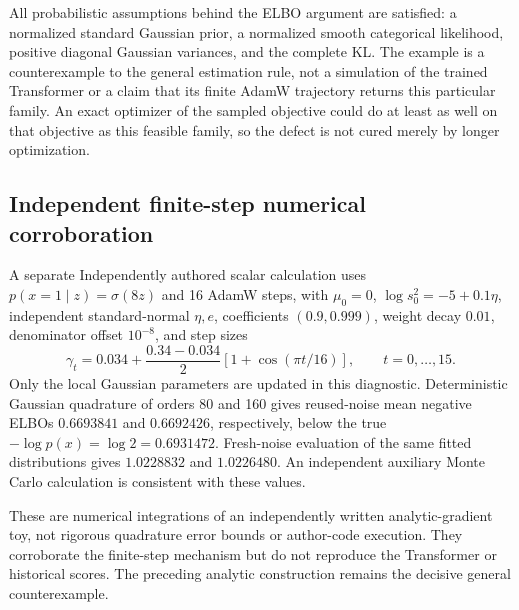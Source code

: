 \documentclass[10pt]{article}
\begin{document}
All probabilistic assumptions behind the ELBO argument are satisfied: a normalized standard Gaussian prior, a normalized smooth categorical likelihood, positive diagonal Gaussian variances, and the complete KL. The example is a counterexample to the general estimation rule, not a simulation of the trained Transformer or a claim that its finite AdamW trajectory returns this particular family. An exact optimizer of the sampled objective could do at least as well on that objective as this feasible family, so the defect is not cured merely by longer optimization.\par
\subsection*{Independent finite-step numerical corroboration}
A separate Independently authored scalar calculation uses \(p(x=1\mid z)=\sigma(8z)\) and 16 AdamW steps, with \(\mu_0=0\), \(\log s_0^2=-5+0.1\eta\), independent standard-normal \(\eta,e\), coefficients \((0.9,0.999)\), weight decay \(0.01\), denominator offset \(10^{-8}\), and step sizes \[\gamma_t=0.034+\frac{0.34-0.034}{2}
 [1+\cos(\pi t/16)],\qquad t=0,\ldots,15.\] Only the local Gaussian parameters are updated in this diagnostic. Deterministic Gaussian quadrature of orders 80 and 160 gives reused-noise mean negative ELBOs \(0.6693841\) and \(0.6692426\), respectively, below the true \(-\log p(x)=\log2=0.6931472\). Fresh-noise evaluation of the same fitted distributions gives \(1.0228832\) and \(1.0226480\). An independent auxiliary Monte Carlo calculation is consistent with these values.\par
These are numerical integrations of an independently written analytic-gradient toy, not rigorous quadrature error bounds or author-code execution. They corroborate the finite-step mechanism but do not reproduce the Transformer or historical scores. The preceding analytic construction remains the decisive general counterexample.\par
\end{document}
